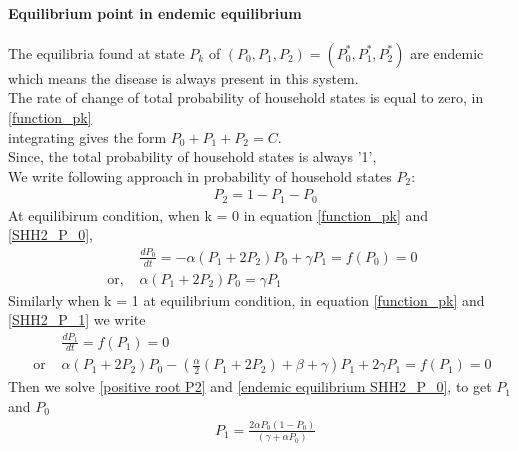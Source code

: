 \documentclass[paper=a4, fontsize=11pt, twoside, BCOR=12mm, parskip=full, listof=totoc]{scrreprt}
\begin{document}
{\paragraph*{Equilibrium point in endemic equilibrium}
The equilibria found at state $P_{k}$ of \( (P_0,P_1,P_2) = (P_{0}^*, P_{1}^*, P_{2}^*) \) are endemic which means the disease is always present in this system.\\ 
The rate of change of total probability of household states is equal to zero, in \ref{function_pk}\\
integrating gives the form $ P_0 + P_1 + P_2 = C $. \\
Since, the total probability of household states is always '1',\\
We write following approach in probability of household states $P_2$:
\begin{equation}
\label{positive root P2}
	\begin{aligned}
   		&P_2 = 1 - P_1 - P_0  
   	\end{aligned}
\end{equation}  
At equilibirum condition, when k = 0 in equation \ref{function_pk} and \ref{SHH2_P_0}, 
\begin{equation}
\label{endemic equilibrium SHH2_P_0}
	\begin{aligned} 
			& \frac{dP_{0}}{dt} = -\alpha ( P_1 + 2P_2 ) P_0 + \gamma P_1 = f(P_0) = 0 \\
\text{ or, } &  \alpha ( P_1 + 2P_2 ) P_0 = \gamma P_1 
	\end{aligned}
\end{equation} 
Similarly when k = 1 at equilibrium condition, in equation \ref{function_pk} and \ref{SHH2_P_1} we write  
\begin{equation}
\label{endemic equilibrium SHH2_P_1}
	\begin{aligned}
			&\frac{dP_{1}}{dt} = f(P_1) = 0 \\
\text{ or } & \alpha( P_1 + 2P_2 )P_0 -(\frac{\alpha}{2}( P_1 + 2P_2 ) + \beta + \gamma)P_1 + 2 \gamma P_1 = f(P_1) = 0
	\end{aligned}    	
\end{equation}
Then we solve \ref{positive root P2} and \ref{endemic equilibrium SHH2_P_0}, to get $P_1$ and $P_0$ 
\begin{equation}
\label{positive root of P1}
	\begin{aligned}
	&P_1 = \frac{2\alpha P_0(1 - P_0)}{(\gamma + \alpha P_0 )}
	\end{aligned}
\end{equation}
}
\end{document}
